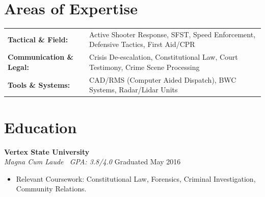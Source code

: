 \documentclass[10pt]{article}
\begin{document}
\section{Areas of Expertise}
\begin{tabularx}{\textwidth}{@{}l X@{}}
\textbf{Tactical \& Field:} & Active Shooter Response, SFST, Speed Enforcement, Defensive Tactics, First Aid/CPR \\
\textbf{Communication \& Legal:} & Crisis De-escalation, Constitutional Law, Court Testimony, Crime Scene Processing \\
\textbf{Tools \& Systems:} & CAD/RMS (Computer Aided Dispatch), BWC Systems, Radar/Lidar Units \\
\end{tabularx}

\section{Education}
 \hfill {\bfseries Vertex State University} \\
{\color{accentcolor}\itshape Magna Cum Laude \textperiodcentered\ GPA: 3.8/4.0} \hfill {\color{darkgray}\small Graduated May 2016}
\begin{itemize}[leftmargin=1.5em, topsep=2pt, itemsep=2pt, parsep=0pt]
    \item Relevant Coursework: Constitutional Law, Forensics, Criminal Investigation, Community Relations.
\end{itemize}
\end{document}
